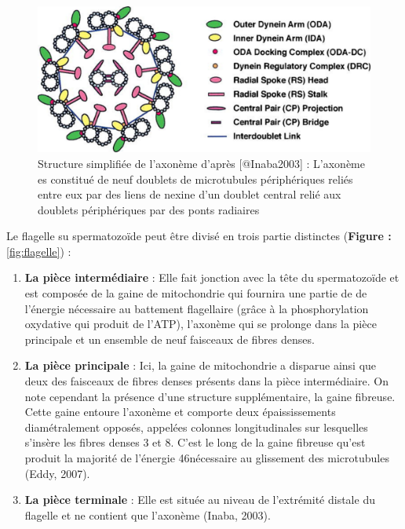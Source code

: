 \documentclass[12pt,twoside]{reedthesis}
\providecommand{\tightlist}{%
  \setlength{\itemsep}{0pt}\setlength{\parskip}{0pt}}
\theoremstyle{definition}
\theoremstyle{definition}
\theoremstyle{remark}
\begin{document}
  \begin{figure}
  
  {\centering \includegraphics[scale=.3]{figure/axoneme} 
  
  }
  
  \caption[Structure simplifiée de l'axonème]{Structure simplifiée de l'axonème d'après [@Inaba2003] : L'axonème es constitué de neuf doublets de microtubules périphériques reliés entre eux par des liens de nexine d'un doublet central relié aux doublets périphériques par des ponts radiaires}\label{fig:axoneme}
  \end{figure}
  
  Le flagelle su spermatozoïde peut être divisé en trois partie distinctes
  (\textbf{Figure : }\ref{fig:flagelle}) :
  
  \begin{enumerate}
  \def\labelenumi{\arabic{enumi}.}
  \tightlist
  \item
    \textbf{La pièce intermédiaire} : Elle fait jonction avec la tête du
    spermatozoïde et est composée de la gaine de mitochondrie qui fournira
    une partie de de l'énergie nécessaire au battement flagellaire (grâce
    à la phosphorylation oxydative qui produit de l'ATP), l'axonème qui se
    prolonge dans la pièce principale et un ensemble de neuf faisceaux de
    fibres denses.\\
  \item
    \textbf{La pièce principale} : Ici, la gaine de mitochondrie a
    disparue ainsi que deux des faisceaux de fibres denses présents dans
    la pièce intermédiaire. On note cependant la présence d'une structure
    supplémentaire, la gaine fibreuse. Cette gaine entoure l'axonème et
    comporte deux épaississements diamétralement opposés, appelées
    colonnes longitudinales sur lesquelles s'insère les fibres denses 3 et
    8. C'est le long de la gaine fibreuse qu'est produit la majorité de
    l'énergie 46nécessaire au glissement des microtubules (Eddy, 2007).\\
  \item
    \textbf{La pièce terminale} : Elle est située au niveau de l'extrémité
    distale du flagelle et ne contient que l'axonème (Inaba, 2003).
  \end{enumerate}
  
\end{document}
